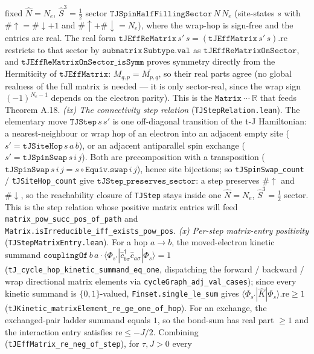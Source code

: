 \documentclass[a4paper,11pt]{article}
\begin{document}
fixed $\hat N=N_e$, $\hat S^3=\tfrac12$ sector $\texttt{TJSpinHalfFillingSector}\,N\,N_e$ (site-states
$s$ with $\#\!\uparrow=\#\!\downarrow+1$ and $\#\!\uparrow+\#\!\downarrow=N_e$), where the wrap-hop is
sign-free and the entries are real.  The real form
$\texttt{tJEffReMatrix}\,s'\,s=(\texttt{tJEffMatrix}\,s'\,s).\mathrm{re}$ restricts to that sector by
$\texttt{submatrix}\,\texttt{Subtype.val}$ as $\texttt{tJEffReMatrixOnSector}$, and
$\texttt{tJEffReMatrixOnSector\_isSymm}$ proves symmetry directly from the Hermiticity of
$\texttt{tJEffMatrix}$: $M_{q,p}=\overline{M_{p,q}}$, so their real parts agree (no global realness of
the full matrix is needed --- it is only sector-real, since the wrap sign $(-1)^{N_e-1}$ depends on
the electron parity).  This is the $\texttt{Matrix}\ \cdots\ \mathbb R$ that feeds Theorem A.18.  \emph{(ix) The
connectivity step relation} (\texttt{TJStepRelation.lean}).  The elementary move
$\texttt{TJStep}\,s\,s'$ is one off-diagonal transition of the t-J Hamiltonian: a nearest-neighbour
or wrap hop of an electron into an adjacent empty site ($s'=\texttt{tJSiteHop}\,s\,a\,b$), or an
adjacent antiparallel spin exchange ($s'=\texttt{tJSpinSwap}\,s\,i\,j$).  Both are precomposition
with a transposition ($\texttt{tJSpinSwap}\,s\,i\,j=s\circ\texttt{Equiv.swap}\,i\,j$), hence site
bijections; so \texttt{tJSpinSwap\_count} / \texttt{tJSiteHop\_count} give
$\texttt{tJStep\_preserves\_sector}$: a step preserves $\#\!\uparrow$ and $\#\!\downarrow$, so the
reachability closure of \texttt{TJStep} stays inside one $\hat N=N_e$, $\hat S^3=\tfrac12$ sector.
This is the step relation whose positive matrix entries will feed
\texttt{matrix\_pow\_succ\_pos\_of\_path} and \texttt{Matrix.isIrreducible\_iff\_exists\_pow\_pos}.
\emph{(x) Per-step matrix-entry positivity} (\texttt{TJStepMatrixEntry.lean}).  For a hop $a\to b$,
the moved-electron kinetic summand $\texttt{couplingOf}\,b\,a\cdot\langle\Phi_{s'}|\hat
c^\dagger_{b\sigma}\hat c_{a\sigma}|\Phi_s\rangle=1$ (\texttt{tJ\_cycle\_hop\_kinetic\_summand\_eq\_one},
dispatching the forward / backward / wrap directional matrix elements via
\texttt{cycleGraph\_adj\_val\_cases}); since every kinetic summand is $\{0,1\}$-valued,
\texttt{Finset.single\_le\_sum} gives $\langle\Phi_{s'}|\hat K|\Phi_s\rangle.\mathrm{re}\geq1$
(\texttt{tJKinetic\_matrixElement\_re\_ge\_one\_of\_hop}).  For an exchange, the exchanged-pair
ladder summand equals $1$, so the bond-sum has real part $\geq1$ and the interaction entry satisfies
$\mathrm{re}\leq-J/2$.  Combining (\texttt{tJEffMatrix\_re\_neg\_of\_step}), for $\tau,J>0$ every
\end{document}
